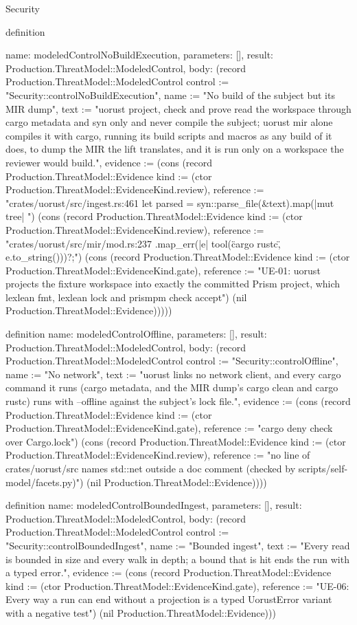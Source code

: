 \begin{lexlean}{Security}
\begin{semanticmodule}
definition{
  name: modeledControlNoBuildExecution,
  parameters: [],
  result: Production.ThreatModel::ModeledControl,
  body: (record Production.ThreatModel::ModeledControl {control := "Security::controlNoBuildExecution", name := "No build of the subject but its MIR dump", text := "uorust project, check and prove read the workspace through cargo metadata and syn only and never compile the subject; uorust mir alone compiles it with cargo, running its build scripts and macros as any build of it does, to dump the MIR the lift translates, and it is run only on a workspace the reviewer would build.", evidence := (cons (record Production.ThreatModel::Evidence {kind := (ctor Production.ThreatModel::EvidenceKind.review), reference := "crates/uorust/src/ingest.rs:461 let parsed = syn::parse_file(&text).map(|mut tree| {"}) (cons (record Production.ThreatModel::Evidence {kind := (ctor Production.ThreatModel::EvidenceKind.review), reference := "crates/uorust/src/mir/mod.rs:237 .map_err(|e| tool(\"cargo rustc\", e.to_string()))?;"}) (cons (record Production.ThreatModel::Evidence {kind := (ctor Production.ThreatModel::EvidenceKind.gate), reference := "UE-01: uorust projects the fixture workspace into exactly the committed Prism project, which lexlean fmt, lexlean lock and prismpm check accept"}) (nil Production.ThreatModel::Evidence))))})
}

definition{
  name: modeledControlOffline,
  parameters: [],
  result: Production.ThreatModel::ModeledControl,
  body: (record Production.ThreatModel::ModeledControl {control := "Security::controlOffline", name := "No network", text := "uorust links no network client, and every cargo command it runs (cargo metadata, and the MIR dump's cargo clean and cargo rustc) runs with --offline against the subject's lock file.", evidence := (cons (record Production.ThreatModel::Evidence {kind := (ctor Production.ThreatModel::EvidenceKind.gate), reference := "cargo deny check over Cargo.lock"}) (cons (record Production.ThreatModel::Evidence {kind := (ctor Production.ThreatModel::EvidenceKind.review), reference := "no line of crates/uorust/src names std::net outside a doc comment (checked by scripts/self-model/facets.py)"}) (nil Production.ThreatModel::Evidence)))})
}

definition{
  name: modeledControlBoundedIngest,
  parameters: [],
  result: Production.ThreatModel::ModeledControl,
  body: (record Production.ThreatModel::ModeledControl {control := "Security::controlBoundedIngest", name := "Bounded ingest", text := "Every read is bounded in size and every walk in depth; a bound that is hit ends the run with a typed error.", evidence := (cons (record Production.ThreatModel::Evidence {kind := (ctor Production.ThreatModel::EvidenceKind.gate), reference := "UE-06: Every way a run can end without a projection is a typed UorustError variant with a negative test"}) (nil Production.ThreatModel::Evidence))})
}

}
\end{semanticmodule}
\end{lexlean}
